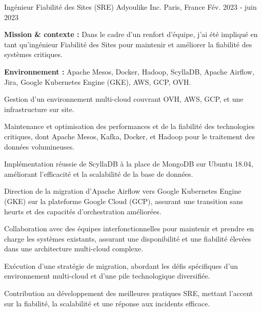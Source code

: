 \begin{cventries}
\cventry
{Ingénieur Fiabilité des Sites (SRE)} %
{Adyoulike Inc.} %
{Paris, France} %
{Fév. 2023 - juin 2023} %
{
  \begin{cvitems} %
    \item {\textbf{Mission \& contexte :} Dans le cadre d'un renfort d'équipe, j'ai été impliqué en tant qu'ingénieur Fiabilité des Sites pour maintenir et améliorer la fiabilité des systèmes critiques.}
    \item {\textbf{Environnement :} Apache Mesos, Docker, Hadoop, ScyllaDB, Apache Airflow, Jira, Google Kubernetes Engine (GKE), AWS, GCP, OVH.}
    \item {Gestion d'un environnement multi-cloud couvrant OVH, AWS, GCP, et une infrastructure sur site.}
    \item {Maintenance et optimisation des performances et de la fiabilité des technologies critiques, dont Apache Mesos, Kafka, Docker, et Hadoop pour le traitement des données volumineuses.}
    \item {Implémentation réussie de ScyllaDB à la place de MongoDB sur Ubuntu 18.04, améliorant l'efficacité et la scalabilité de la base de données.}
    \item {Direction de la migration d'Apache Airflow vers Google Kubernetes Engine (GKE) sur la plateforme Google Cloud (GCP), assurant une transition sans heurts et des capacités d'orchestration améliorées.}
    \item {Collaboration avec des équipes interfonctionnelles pour maintenir et prendre en charge les systèmes existants, assurant une disponibilité et une fiabilité élevées dans une architecture multi-cloud complexe.}
    \item {Exécution d'une stratégie de migration, abordant les défis spécifiques d'un environnement multi-cloud et d'une pile technologique diversifiée.}
    \item {Contribution au développement des meilleures pratiques SRE, mettant l'accent sur la fiabilité, la scalabilité et une réponse aux incidents efficace.}
  \end{cvitems}
}


\end{cventries}

